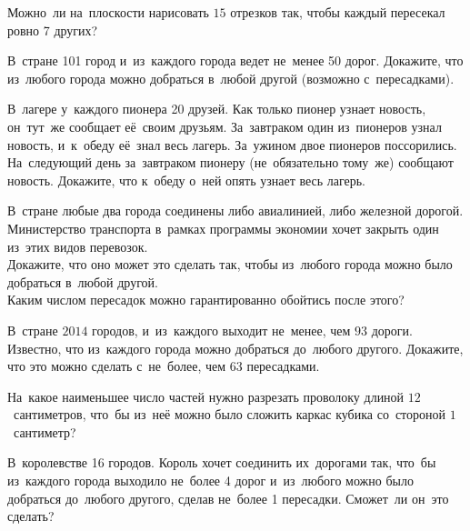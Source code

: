 \begin{problems}

\itemx{$^\circ$}
Можно~ли на~плоскости нарисовать $15$ отрезков так, чтобы каждый пересекал
ровно 7 других?

\item
В~стране 101 город и~из~каждого города ведет не~менее 50 дорог.
Докажите, что из~любого города можно добраться в~любой другой
(возможно с~пересадками).

\item
В~лагере у~каждого пионера 20 друзей.
Как только пионер узнает новость, он~тут~же сообщает её~своим друзьям.
За~завтраком один из~пионеров узнал новость, и~к~обеду её~знал весь лагерь.
За~ужином двое пионеров поссорились.
На~следующий день за~завтраком пионеру (не~обязательно тому~же) сообщают
новость.
Докажите, что к~обеду о~ней опять узнает весь лагерь.

\item
В~стране любые два города соединены либо авиалинией, либо железной дорогой.
Министерство транспорта в~рамках программы экономии хочет закрыть один из~этих
видов перевозок.
\\
\sp
Докажите, что оно может это сделать так, чтобы из~любого города можно было
добраться в~любой другой.
\\
\sp
Каким числом пересадок можно гарантированно обойтись после этого?

\item
В~стране $2014$ городов, и~из~каждого выходит не~менее, чем $93$ дороги.
Известно, что из~каждого города можно добраться до~любого другого.
Докажите, что это можно сделать с~не~более, чем $63$ пересадками.

\item
На~какое наименьшее число частей нужно разрезать проволоку длиной
$12$~сантиметров, что~бы из~неё можно было сложить каркас кубика со~стороной
$1$~сантиметр?

\itemx{*}
В~королевстве 16 городов.
Король хочет соединить их~дорогами так, что~бы из~каждого города выходило
не~более 4 дорог и~из~любого можно было добраться до~любого другого, сделав
не~более 1 пересадки.
Сможет~ли он~это сделать?

\end{problems}

